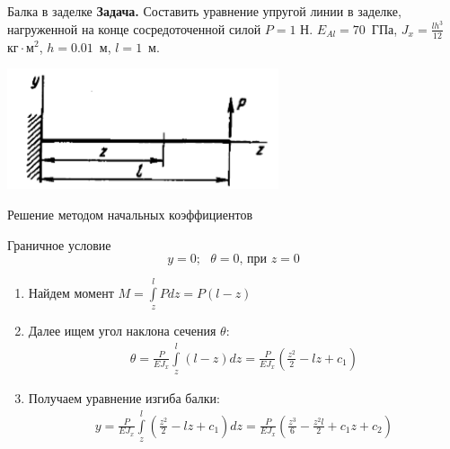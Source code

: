 \documentclass[ignoreonframetext,unicode]{beamer}
\begin{document}
	\begin{frame}{Балка в заделке}
	\textbf{Задача.} Составить уравнение упругой линии в заделке, нагруженной на конце сосредоточенной силой $P = 1$ Н. 
	$E_{Al} = 70$~ГПа, $ J_{x} = \frac{l h^3}{12}$~$\mbox{кг} \cdot \mbox{м}^2$, $h = 0.01$~м, $l = 1$~м.
	
	\begin{center}
		\includegraphics[width=0.6\textwidth]{pic.7}
	\end{center}
	
	\end{frame}

	\begin{frame}{Решение методом начальных коэффициентов}

		\begin{block}{Граничное условие}
		\[
		y = 0;\mbox{ } \theta = 0\mbox{, при } z = 0
		\]		
		\end{block}

	\begin{enumerate}
	\item Найдем момент $M = \int\limits_z^l P d z = P(l - z)$
	
	\item Далее ищем угол наклона сечения $\theta$:
	\begin{gather*}
	\theta = \frac{P}{E J_{x}} \int\limits_z^l (l - z)d z = \frac{P}{E J_{x}} (\frac{z^2}{2} - l z + c_1)
	\end{gather*}

		\item Получаем уравнение изгиба балки:
	\begin{gather*}
		y = \frac{P}{E J_{x}} \int\limits_z^l (\frac{z^2}{2} - l z + c_1) d z = \frac{P}{E J_{x}} (\frac{z^3}{6} - \frac{z^2 l}{2} + c_1 z + c_2)
	\end{gather*}

	\end{enumerate}
\end{frame}
\end{document}
